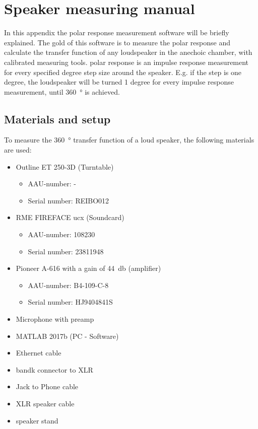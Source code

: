 \chapter{Speaker measuring manual} \label{appendix:measuring_manual}
In this appendix the polar response measurement software will be briefly explained. The gold of this software is to measure the polar response and calculate the transfer function of any loudspeaker in the anechoic chamber, with calibrated measuring tools. polar response is an impulse response measurement for every specified degree step size around the speaker. E.g. if the step is one degree, the loudspeaker will be turned 1 degree for every  impulse response measurement, until \SI{360}{\degree} is achieved.

\section*{Materials and setup}
To measure the \SI{360}{\degree} transfer function of a loud speaker, the following materials are used:
\begin{itemize}
\item Outline ET 250-3D (Turntable)
\begin{itemize}[noitemsep]
\item AAU-number: -
\item Serial number: REIBO012
\end{itemize}
\item RME FIREFACE ucx (Soundcard)
\begin{itemize}[noitemsep]
\item AAU-number: 108230
\item Serial number: 23811948
\end{itemize}
\item Pioneer A-616 with a gain of \SI{44}{\decibel} (amplifier)
\begin{itemize}[noitemsep]
\item AAU-number: B4-109-C-8
\item Serial number: HJ9404841S
\end{itemize}
\item Microphone with preamp
\item MATLAB 2017b (PC - Software)
\item Ethernet cable 
\item \gls{bandk} connector to XLR
\item Jack to Phone cable
\item XLR speaker cable
\item speaker stand
\end{itemize}

